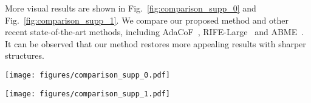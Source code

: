 \documentclass[10pt,twocolumn,letterpaper]{article}
\begin{document}
	More visual results are shown in Fig.~\ref{fig:comparison_supp_0} and Fig.~\ref{fig:comparison_supp_1}.
	We compare our proposed method and other recent state-of-the-art methods, including AdaCoF~\cite{lee2020adacof}, RIFE-Large~\cite{rife} and ABME~\cite{asymmetric}. It can be observed that our method restores more appealing results with sharper structures. 


	
	
	\begin{figure*}[t]
		\begin{center}
\texttt{[image: figures/comparison\_supp\_0.pdf]}
		\end{center}
		\vspace{-0.15in}
		\caption{Visual comparison among different VFI methods on the Vimeo90K~\cite{vimeo90k} testing set.}
		\label{fig:comparison_supp_0}
\end{figure*}
	
	
	\begin{figure*}[t]
		\begin{center}
\texttt{[image: figures/comparison\_supp\_1.pdf]}
		\end{center}
		\vspace{-0.15in}
		\caption{Visual comparison among different VFI methods on the Vimeo90K~\cite{vimeo90k} testing set.}
		\label{fig:comparison_supp_1}
\end{figure*}
	





	
\end{document}
